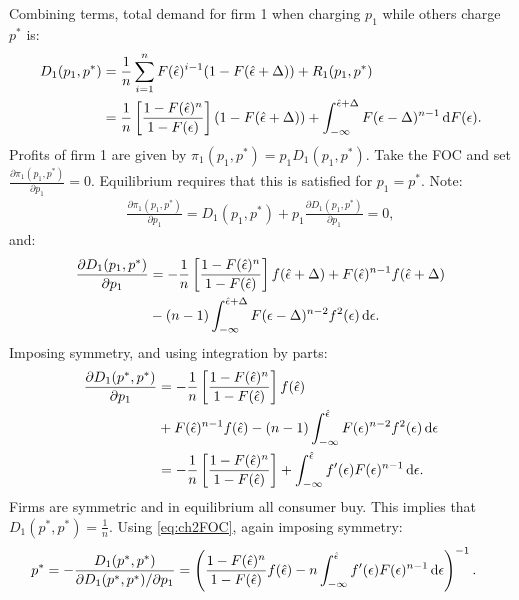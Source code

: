 Combining terms, total demand for firm 1 when charging $p_1$ while others
charge $p^*$ is:
\begin{align}
	D_1(p_1,p^*) & =\frac{1}{n}\sum_{i=1}^nF(\hat\epsilon)^{i-1}
	(1-F(\hat\epsilon+\Delta))+R_1(p_1,p^*)                      \\
	             & =\frac{1}{n}\left[
	\frac{1-F(\hat\epsilon)^n}{1-F(\epsilon)}\right]
	(1-F(\hat\epsilon+\Delta))+
	\int_{-\infty}^{\hat\epsilon+\Delta}
	F(\epsilon-\Delta)^{n-1}\,\textrm{d}F(\epsilon).
\end{align}
Profits of firm 1 are given by $\pi_1(p_1,p^*)=p_1D_1(p_1,p^*)$. Take the
FOC and set $\frac{\partial\pi_1(p_1,p^*)}{\partial p_1}=0$. Equilibrium
requires that this is satisfied for $p_1=p^*$. Note:
\begin{align}
	\frac{\partial\pi_1(p_1,p^*)}{\partial p_1}=D_1(p_1,p^*)+
	p_1\frac{\partial D_1(p_1,p^*)}{\partial p_1}=0,
	\label{eq:ch2FOC}
\end{align}
and:
\begin{align}
	\frac{\partial D_1(p_1,p^*)}{\partial p_1} & =
	-\frac{1}{n}\left[\frac{1-F(\hat\epsilon)^n}{1-F(\hat\epsilon)}\right]
	f(\hat\epsilon+\Delta)+F(\hat\epsilon)^{n-1}f(\hat\epsilon+\Delta)                      \\
	                                           & -(n-1)\int_{-\infty}^{\hat\epsilon+\Delta}
	F(\epsilon-\Delta)^{n-2}f^2(\epsilon)\,\textrm{d}\epsilon.
\end{align}
Imposing symmetry, and using integration by parts:
\begin{align}
	\frac{\partial D_1(p^*,p^*)}{\partial p_1} & =
	-\frac{1}{n}\left[\frac{1-F(\hat\epsilon)^n}{1-F(\hat\epsilon)}\right]
	f(\hat\epsilon)                                \\
	                                           & +
	F(\hat\epsilon)^{n-1}f(\hat\epsilon)
	-(n-1)\int_{-\infty}^{\hat\epsilon}
	F(\epsilon)^{n-2}f^2(\epsilon)\,\textrm{d}\epsilon       \\
	                                           & =
	-\frac{1}{n}\left[\frac{1-F(\hat\epsilon)^n}{1-F(\hat\epsilon)}\right]+
	\int_{-\infty}^{\hat\epsilon}f'(\epsilon)F(\epsilon)^{n-1}\,\textrm{d}\epsilon.
\end{align}
Firms are symmetric and in equilibrium all consumer buy. This implies
that $D_1(p^*,p^*)=\frac{1}{n}$. Using \ref{eq:ch2FOC}, again imposing
symmetry:
\begin{align}
	p^* & =-\frac{D_1(p^*,p^*)}{\partial D_1(p^*,p^*)/\partial p_1}
	=\left(
	\frac{1-F(\hat\epsilon)^n}{1-F(\hat\epsilon)}f(\hat\epsilon)
	-n\int_{-\infty}^{\hat\epsilon}f'(\epsilon)F(\epsilon)^{n-1}\,\textrm{d}\epsilon
	\right)^{-1}.
\end{align}
